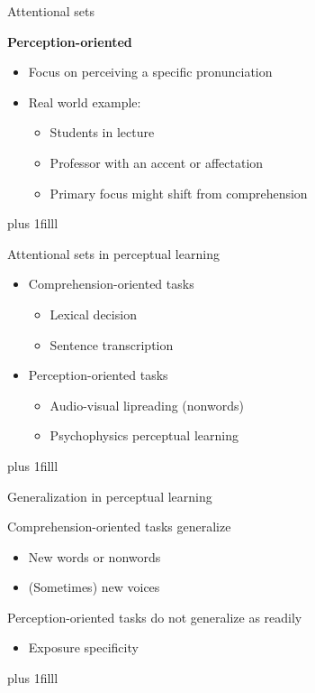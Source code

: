 \documentclass{beamer}
\newcommand{\btVFill}{\vskip0pt plus 1filll}
\begin{document}
\begin{frame}{Attentional sets}

\textbf{Perception-oriented}
\begin{itemize}
\item Focus on perceiving a specific pronunciation
\item Real world example:
\begin{itemize}
\item Students in lecture
\item Professor with an accent or affectation
\item Primary focus might shift from comprehension
\end{itemize}
\end{itemize}
\btVFill
\begin{flushright}
\scriptsize
\citet{Pitt2012}
\end{flushright}
\end{frame}

\begin{frame}{Attentional sets in perceptual learning}

\begin{itemize}
\item Comprehension-oriented tasks
\begin{itemize}
\item Lexical decision
\item Sentence transcription
\end{itemize}
\item Perception-oriented tasks
\begin{itemize}
\item Audio-visual lipreading (nonwords)
\item Psychophysics perceptual learning
\end{itemize}
\end{itemize}

\btVFill
\begin{flushright}
\scriptsize
\citet{Ahissar1993,Norris2003,Vroomen2007, Bradlow2008,Reinisch2014}
\end{flushright}

\end{frame}

\begin{frame}{Generalization in perceptual learning}

 Comprehension-oriented tasks generalize
\begin{itemize}
\item New words or nonwords
\item (Sometimes) new voices
\end{itemize}
Perception-oriented tasks do not generalize as readily
\begin{itemize}
\item Exposure specificity
\end{itemize}
\btVFill
\begin{flushright}
\scriptsize
\citet{Ahissar1993, Norris2003, Kraljic2005, Bradlow2008, Pitt2012, Reinisch2013}
\end{flushright}

\end{frame}
\end{document}
